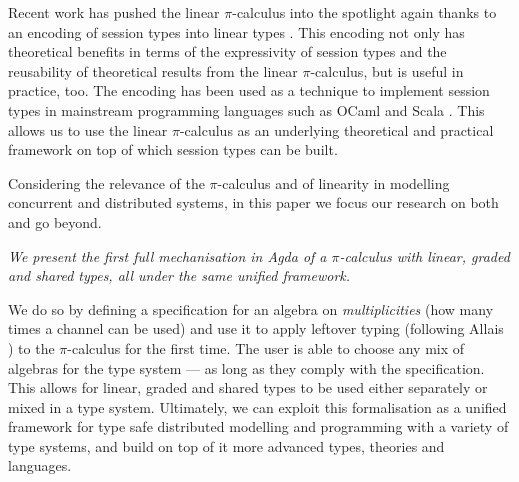 \documentclass[sigplan,10pt,anonymous,review]{acmart}
\theoremstyle{definition}
\newcommand{\picalc}{$\pi$-calculus}
\begin{document}
Recent work has pushed the linear \picalc{} into the spotlight again \cite{KPT96} thanks to an encoding of session types into linear types \cite{DardhaGS12,Dardha14,DardhaGS17}.
This encoding not only has theoretical benefits in terms of the expressivity of session types and the reusability of theoretical results from the linear \picalc{}, but is useful in practice, too.
The encoding has been used as a technique to implement session types in mainstream programming languages such as OCaml \cite{Padovani17} and Scala \cite{ScalasY16,ScalasDHY17}.
This allows us to use the linear \picalc{} as an underlying theoretical and practical framework on top of which session types can be built.

Considering the relevance of the \picalc{} and of linearity in modelling concurrent and distributed systems, in this paper we focus our research on both and go beyond.

\emph{We present the first full mechanisation in Agda of a \picalc{} with linear, graded and shared types, all under the same unified framework.}

We do so by defining a specification for an algebra on \emph{multiplicities} (how many times a channel can be used) and use it to apply leftover typing (following Allais \cite{Allais2018a}) to the \picalc{} for the first time.
The user is able to choose any mix of algebras for the type system --- as long as they comply with the specification.
This allows for linear, graded and shared types to be used either separately or mixed in a type system.
Ultimately, we can exploit this formalisation as a unified framework for type safe distributed modelling and programming with a variety of type systems, and build on top of it more advanced types, theories and languages.
\end{document}
